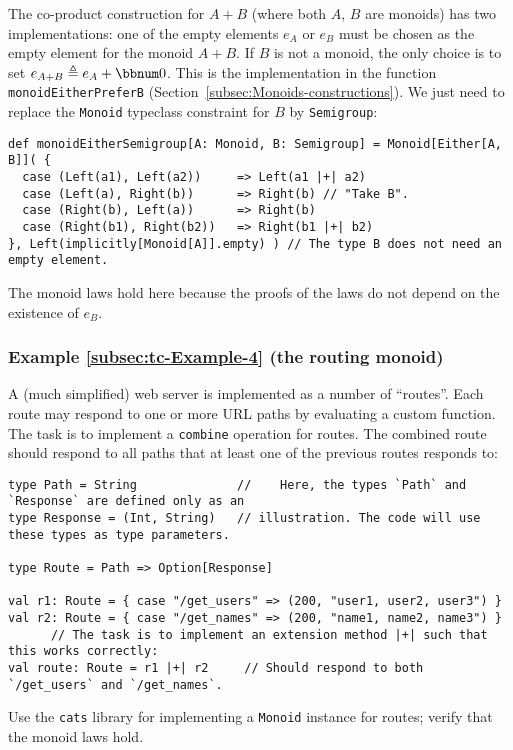 The co-product construction for $A+B$ (where both $A$, $B$ are
monoids) has two implementations: one of the empty elements $e_{A}$
or $e_{B}$ must be chosen as the empty element for the monoid $A+B$.
If $B$ is not a monoid, the only choice is to set $e_{A+B}\triangleq e_{A}+\bbnum 0$.
This is the implementation in the function \lstinline!monoidEitherPreferB!
(Section~\ref{subsec:Monoids-constructions}). We just need to replace
the \lstinline!Monoid! typeclass constraint for $B$ by \lstinline!Semigroup!:
\begin{lstlisting}
def monoidEitherSemigroup[A: Monoid, B: Semigroup] = Monoid[Either[A, B]]( {
  case (Left(a1), Left(a2))     => Left(a1 |+| a2)
  case (Left(a), Right(b))      => Right(b) // "Take B".
  case (Right(b), Left(a))      => Right(b)
  case (Right(b1), Right(b2))   => Right(b1 |+| b2)
}, Left(implicitly[Monoid[A]].empty) ) // The type B does not need an empty element.
\end{lstlisting}
The monoid laws hold here because the proofs of the laws do not depend
on the existence of $e_{B}$.

\subsubsection{Example \label{subsec:tc-Example-4}\ref{subsec:tc-Example-4} (the
routing monoid)}

A (much simplified) web server is implemented as a number of ``routes''.
Each route may respond to one or more URL paths by evaluating a custom
function. The task is to implement a \lstinline!combine! operation
for routes. The combined route should respond to all paths that at
least one of the previous routes responds to:
\begin{lstlisting}
type Path = String              //    Here, the types `Path` and `Response` are defined only as an
type Response = (Int, String)   // illustration. The code will use these types as type parameters.

type Route = Path => Option[Response]

val r1: Route = { case "/get_users" => (200, "user1, user2, user3") }
val r2: Route = { case "/get_names" => (200, "name1, name2, name3") }
      // The task is to implement an extension method |+| such that this works correctly:
val route: Route = r1 |+| r2     // Should respond to both `/get_users` and `/get_names`.
\end{lstlisting}
Use the \texttt{cats} library for implementing a \lstinline!Monoid!
instance for routes; verify that the monoid laws hold.

